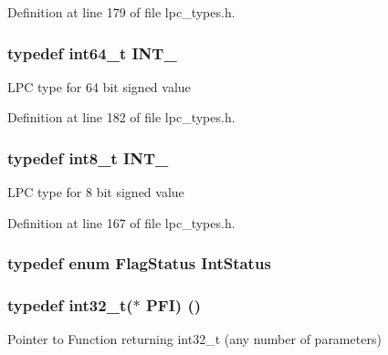 Definition at line 179 of file lpc\+\_\+types.\+h.

\subsubsection[{\texorpdfstring{I\+N\+T\+\_\+64}{INT_64}}]{\setlength{\rightskip}{0pt plus 5cm}typedef int64\+\_\+t {\bf I\+N\+T\+\_}}\hypertarget{group__LPC__Types__Public__Types_ga1a0aab29eee6b306564084e005fa5750}{}\label{group__LPC__Types__Public__Types_ga1a0aab29eee6b306564084e005fa5750}
L\+PC type for 64 bit signed value 

Definition at line 182 of file lpc\+\_\+types.\+h.

\subsubsection[{\texorpdfstring{I\+N\+T\+\_\+8}{INT_8}}]{\setlength{\rightskip}{0pt plus 5cm}typedef int8\+\_\+t {\bf I\+N\+T\+\_}}\hypertarget{group__LPC__Types__Public__Types_gac172005ce53b001f50a677cc10bd17b0}{}\label{group__LPC__Types__Public__Types_gac172005ce53b001f50a677cc10bd17b0}
L\+PC type for 8 bit signed value 

Definition at line 167 of file lpc\+\_\+types.\+h.

\subsubsection[{\texorpdfstring{Int\+Status}{IntStatus}}]{\setlength{\rightskip}{0pt plus 5cm}typedef  enum {\bf Flag\+Status}  {\bf Int\+Status}}\hypertarget{group__LPC__Types__Public__Types_gab7d263072f745b4f3913fb0afc434c4e}{}\label{group__LPC__Types__Public__Types_gab7d263072f745b4f3913fb0afc434c4e}
\subsubsection[{\texorpdfstring{P\+FI}{PFI}}]{\setlength{\rightskip}{0pt plus 5cm}typedef int32\+\_\+t($\ast$ P\+FI) ()}\hypertarget{group__LPC__Types__Public__Types_ga5cad251913e41ad7a8c765945356ec47}{}\label{group__LPC__Types__Public__Types_ga5cad251913e41ad7a8c765945356ec47}
Pointer to Function returning int32\+\_\+t (any number of parameters) 

